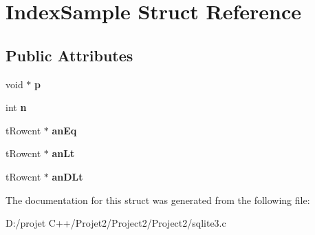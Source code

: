 \hypertarget{struct_index_sample}{}\section{Index\+Sample Struct Reference}
\label{struct_index_sample}
\subsection*{Public Attributes}
\begin{DoxyCompactItemize}
\item 
\mbox{\label{struct_index_sample_a539f00d3096fd379146e77e74b513dac}} 
void $\ast$ {\bfseries p}
\item 
\mbox{\label{struct_index_sample_a89016f3b6580ee9c63c4ac78e2e6e76c}} 
int {\bfseries n}
\item 
\mbox{\label{struct_index_sample_a048e60e638c6e0305812102366822e67}} 
t\+Rowcnt $\ast$ {\bfseries an\+Eq}
\item 
\mbox{\label{struct_index_sample_a4853d16cdb7cf5099e8478471ae729de}} 
t\+Rowcnt $\ast$ {\bfseries an\+Lt}
\item 
\mbox{\label{struct_index_sample_ab17baab68e2890d9939c3840987051c2}} 
t\+Rowcnt $\ast$ {\bfseries an\+D\+Lt}
\end{DoxyCompactItemize}


The documentation for this struct was generated from the following file\+:\begin{DoxyCompactItemize}
\item 
D\+:/projet C++/\+Projet2/\+Project2/\+Project2/sqlite3.\+c\end{DoxyCompactItemize}
